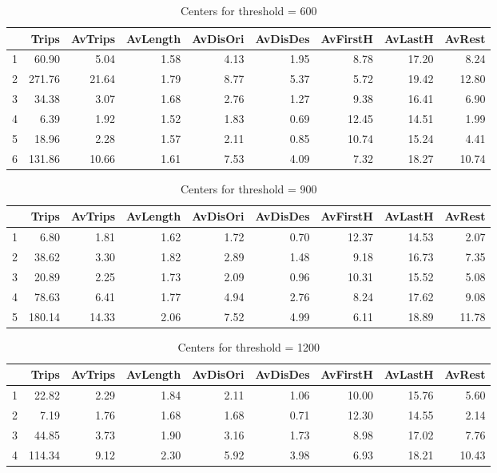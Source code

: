 \begin{table*}[ht]
\centering
\begin{tabular}{rrrrrrrrr}
  \hline
 & Trips & AvTrips & AvLength & AvDisOri & AvDisDes & AvFirstH & AvLastH & AvRest \\
  \hline
1 & 60.90 & 5.04 & 1.58 & 4.13 & 1.95 & 8.78 & 17.20 & 8.24 \\
  2 & 271.76 & 21.64 & 1.79 & 8.77 & 5.37 & 5.72 & 19.42 & 12.80 \\
  3 & 34.38 & 3.07 & 1.68 & 2.76 & 1.27 & 9.38 & 16.41 & 6.90 \\
  4 & 6.39 & 1.92 & 1.52 & 1.83 & 0.69 & 12.45 & 14.51 & 1.99 \\
  5 & 18.96 & 2.28 & 1.57 & 2.11 & 0.85 & 10.74 & 15.24 & 4.41 \\
  6 & 131.86 & 10.66 & 1.61 & 7.53 & 4.09 & 7.32 & 18.27 & 10.74 \\
   \hline
\end{tabular}
\caption{Centers for threshold = 600}
\end{table*}

\begin{table*}[ht]
\centering
\begin{tabular}{rrrrrrrrr}
  \hline
 & Trips & AvTrips & AvLength & AvDisOri & AvDisDes & AvFirstH & AvLastH & AvRest \\
  \hline
1 & 6.80 & 1.81 & 1.62 & 1.72 & 0.70 & 12.37 & 14.53 & 2.07 \\
  2 & 38.62 & 3.30 & 1.82 & 2.89 & 1.48 & 9.18 & 16.73 & 7.35 \\
  3 & 20.89 & 2.25 & 1.73 & 2.09 & 0.96 & 10.31 & 15.52 & 5.08 \\
  4 & 78.63 & 6.41 & 1.77 & 4.94 & 2.76 & 8.24 & 17.62 & 9.08 \\
  5 & 180.14 & 14.33 & 2.06 & 7.52 & 4.99 & 6.11 & 18.89 & 11.78 \\
   \hline
\end{tabular}
\caption{Centers for threshold = 900}
\end{table*}


\begin{table*}[ht]
\centering
\begin{tabular}{rrrrrrrrr}
  \hline
 & Trips & AvTrips & AvLength & AvDisOri & AvDisDes & AvFirstH & AvLastH & AvRest \\
  \hline
1 & 22.82 & 2.29 & 1.84 & 2.11 & 1.06 & 10.00 & 15.76 & 5.60 \\
  2 & 7.19 & 1.76 & 1.68 & 1.68 & 0.71 & 12.30 & 14.55 & 2.14 \\
  3 & 44.85 & 3.73 & 1.90 & 3.16 & 1.73 & 8.98 & 17.02 & 7.76 \\
  4 & 114.34 & 9.12 & 2.30 & 5.92 & 3.98 & 6.93 & 18.21 & 10.43 \\
   \hline
\end{tabular}
\caption{Centers for threshold = 1200}
\end{table*}


